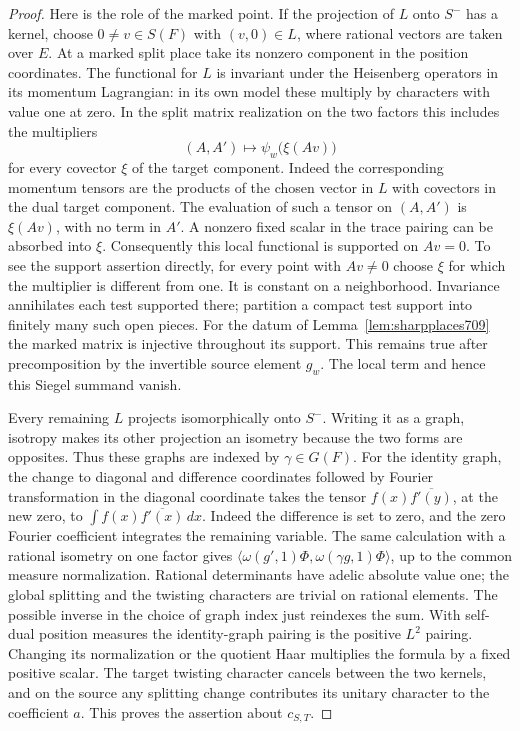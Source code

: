 \documentclass[a4paper,11pt]{article}
\theoremstyle{definition}
\theoremstyle{remark}
\numberwithin{equation}{section}
\begin{document}
\begin{proof}
Here is the role of the marked point. If the projection
of \(L\) onto \(S^-\) has a kernel, choose \(0\ne v\in S(F)\)
with \((v,0)\in L\), where rational vectors are taken over
\(E\). At a marked split place take its nonzero component
in the position coordinates. The functional for \(L\) is
invariant under the Heisenberg operators in its momentum
Lagrangian: in its own model these multiply by characters
with value one at zero. In the split matrix realization on
the two factors this includes the multipliers
\[
                   (A,A')\longmapsto
                         \psi_w\bigl(\xi(Av)\bigr)
\]
for every covector \(\xi\) of the target component. Indeed
the corresponding momentum tensors are the products of the
chosen vector in \(L\) with covectors in the dual target
component. The evaluation of such a tensor on \((A,A')\)
is \(\xi(Av)\), with no term in \(A'\). A nonzero fixed
scalar in the trace pairing can be absorbed into \(\xi\).
Consequently this local functional is supported on
\(Av=0\). To see the support assertion directly, for every
point with \(Av\ne0\) choose \(\xi\) for which the multiplier
is different from one. It is constant on a neighborhood.
Invariance annihilates each test supported there; partition
a compact test support into finitely many such open pieces.
For the datum of Lemma~\ref{lem:sharpplaces709} the marked
matrix is injective throughout its support. This remains
true after precomposition by the invertible source element
\(g_w\). The local term and hence this Siegel summand vanish.

Every remaining \(L\) projects isomorphically onto \(S^-\).
Writing it as a graph, isotropy makes its other projection
an isometry because the two forms are opposites. Thus these
graphs are indexed by \(\gamma\in G(F)\). For the identity
graph, the change to diagonal and difference coordinates
followed by Fourier transformation in the diagonal
coordinate takes the tensor \(f(x)\overline{f'(y)}\), at
the new zero, to \(\int f(x)\overline{f'(x)}\,dx\). Indeed
the difference is set to zero, and the zero Fourier
coefficient integrates the remaining variable. The same
calculation with a rational isometry on one factor gives
\(\langle\omega(g',1)\Phi,\omega(\gamma g,1)\Phi\rangle\),
up to the common measure normalization. Rational determinants
have adelic absolute value one; the global splitting and
the twisting characters are trivial on rational elements.
The possible inverse in the choice of graph index just
reindexes the sum. With self-dual position measures the
identity-graph pairing is the positive \(L^2\) pairing.
Changing its normalization or the quotient Haar multiplies
the formula by a fixed positive scalar. The target twisting
character cancels between the two kernels, and on the source
any splitting change contributes its unitary character to
the coefficient \(a\). This proves the assertion about
\(c_{S,T}\).


\end{proof}
\end{document}
